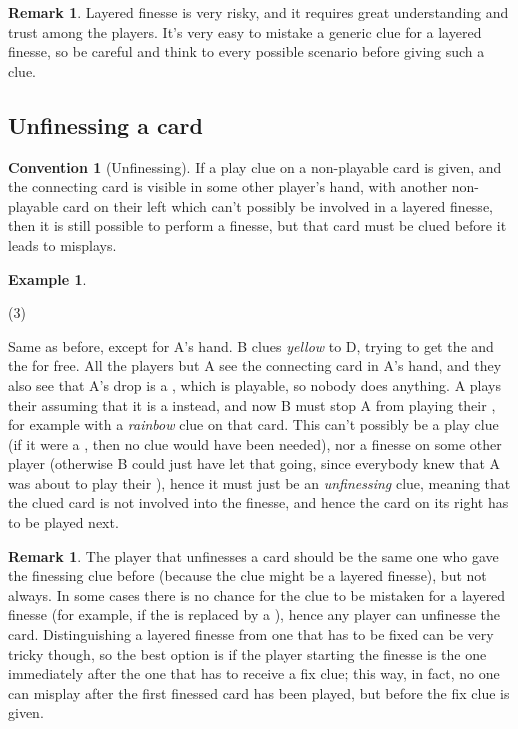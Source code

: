 \documentclass[a4paper]{article}
\theoremstyle{plain}
\theoremstyle{definition}
\newtheorem{remark}[theorem]{Remark}
\newtheorem{example}[theorem]{Example}
\newtheorem{convention}[theorem]{Convention}
\begin{document}
\begin{remark}
	Layered finesse is very risky, and it requires great understanding and trust among the players. It's very easy to mistake a generic clue for a layered finesse, so be careful and think to every possible scenario before giving such a clue.
\end{remark}

\subsection{Unfinessing a card}

\begin{convention}[Unfinessing]
	\label{unfinessing}
	If a play clue on a non-playable card is given, and the connecting card is visible in some other player's hand, with another non-playable card on their left which can't possibly be involved in a layered finesse, then it is still possible to perform a finesse, but that card must be clued before it leads to misplays.
\end{convention}

\begin{example}
	\hfill
	\begin{tasks}(3)
		\task[+]      
		\task[A]    
		\task[B]    
		\task[C]     
		\task[D]    
		\task[E]    
	\end{tasks}
	
	Same as before, except for A's hand. B clues \textit{yellow} to D, trying to get the  and the  for free. All the players but A see the connecting card in A's hand, and they also see that A's drop is a , which is playable, so nobody does anything. A plays their  assuming that it is a  instead, and now B must stop A from playing their , for example with a \textit{rainbow} clue on that card. This can't possibly be a play clue (if it were a , then no clue would have been needed), nor a finesse on some other player (otherwise B could just have let that going, since everybody knew that A was about to play their ), hence it must just be an \textit{unfinessing} clue, meaning that the clued card is not involved into the finesse, and hence the card on its right has to be played next.
\end{example}

\begin{remark}
	The player that unfinesses a card should be the same one who gave the finessing clue before (because the clue might be a layered finesse), but not always. In some cases there is no chance for the clue to be mistaken for a layered finesse (for example, if the  is replaced by a ), hence any player can unfinesse the card. Distinguishing a layered finesse from one that has to be fixed can be very tricky though, so the best option is if the player starting the finesse is the one immediately after the one that has to receive a fix clue; this way, in fact, no one can misplay after the first finessed card has been played, but before the fix clue is given.
\end{remark}
\end{document}
